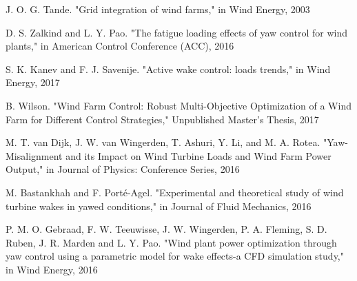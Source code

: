 \begin{thebibliography}{99} %

J. O. G. Tande. "Grid integration of wind farms," in Wind Energy, 2003

 D. S. Zalkind and L. Y. Pao. "The fatigue loading effects of yaw control for wind plants," in American Control Conference (ACC), 2016

S. K. Kanev and F. J. Savenije. "Active wake control: loads trends," in Wind Energy, 2017

B. Wilson. "Wind Farm Control: Robust Multi-Objective Optimization of a Wind Farm for Different Control Strategies," Unpublished Master's Thesis, 2017

M. T. van Dijk, J. W. van Wingerden, T. Ashuri, Y. Li, and M. A. Rotea. "Yaw-Misalignment and its Impact on Wind Turbine Loads and Wind Farm Power Output," in Journal of Physics: Conference Series, 2016

M. Bastankhah and F. Porté-Agel. "Experimental and theoretical study of wind turbine wakes in yawed conditions," in Journal of Fluid Mechanics, 2016

P. M. O. Gebraad, F. W. Teeuwisse, J. W. Wingerden, P. A. Fleming, S. D. Ruben, J. R. Marden and L. Y. Pao. "Wind plant power optimization through yaw control using a parametric model for wake effects-a CFD simulation study," in Wind Energy, 2016

\end{thebibliography}